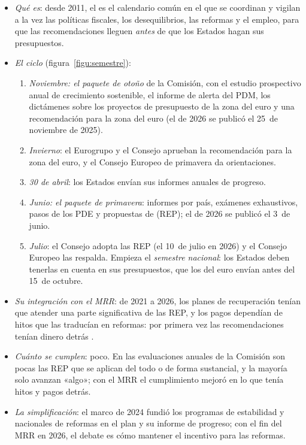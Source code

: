 \documentclass[11pt]{article}
\begin{document}
\begin{itemize}
\item \emph{Qué es}: desde 2011, el  es el calendario común en el que se coordinan y vigilan a la vez las políticas fiscales, los desequilibrios, las reformas y el empleo, para que las recomendaciones lleguen \emph{antes} de que los Estados hagan sus presupuestos.
\item \emph{El ciclo} (figura~\ref{figu:semestre}):
  \begin{enumerate}
  \item \emph{Noviembre: el paquete de otoño} de la Comisión, con el estudio prospectivo anual de crecimiento sostenible, el informe de alerta del PDM, los dictámenes sobre los proyectos de presupuesto de la zona del euro y una recomendación para la zona del euro (el de 2026 se publicó el 25~de noviembre de 2025)\nocite{CE2025PaqueteOtono}.
  \item \emph{Invierno}: el Eurogrupo y el Consejo aprueban la recomendación para la zona del euro, y el Consejo Europeo de primavera da orientaciones.
  \item \emph{30 de abril}: los Estados envían sus informes anuales de progreso.
  \item \emph{Junio: el paquete de primavera}: informes por país, exámenes exhaustivos, pasos de los PDE y propuestas de  (REP); el de 2026 se publicó el 3~de junio\nocite{CE2026PaquetePrimavera}.
  \item \emph{Julio}: el Consejo adopta las REP (el 10~de julio en 2026) y el Consejo Europeo las respalda. Empieza el \emph{semestre nacional}: los Estados deben tenerlas en cuenta en sus presupuestos, que los del euro envían antes del 15~de octubre.
  \end{enumerate}
\item \emph{Su integración con el MRR}: de 2021 a 2026, los planes de recuperación tenían que atender una parte significativa de las REP, y los pagos dependían de hitos que las traducían en reformas: por primera vez las recomendaciones tenían dinero detrás .
\item \emph{Cuánto se cumplen}: poco. En las evaluaciones anuales de la Comisión son pocas las REP que se aplican del todo o de forma sustancial, y la mayoría solo avanzan «algo»; con el MRR el cumplimiento mejoró en lo que tenía hitos y pagos detrás.
\item \emph{La simplificación}: el marco de 2024 fundió los programas de estabilidad y nacionales de reformas en el plan y su informe de progreso; con el fin del MRR en 2026, el debate es cómo mantener el incentivo para las reformas.
\end{itemize}
\end{document}
